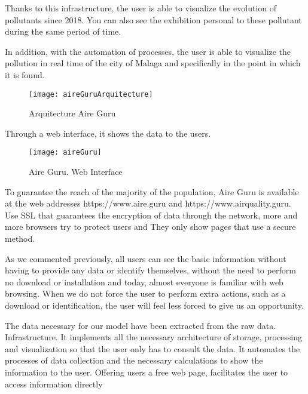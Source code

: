 Thanks to this infrastructure, the user is able to visualize the evolution of pollutants since 2018. You can also see the exhibition
personal to these pollutant during the same period of time.

In addition, with the automation of processes, the user is able to visualize the pollution in real time of the city of Malaga and specifically in the point
in which it is found. \\

\begin{figure}[ht]
    \centering
    \texttt{[image: aireGuruArquitecture]}
    \caption{Arquitecture Aire Guru}
\end{figure}

Through a web interface, it shows the data to the users. \\

\begin{figure}[ht]
    \centering
    \texttt{[image: aireGuru]}
    \caption{Aire Guru. Web Interface}
\end{figure}

To guarantee the reach of the majority of the population, Aire Guru is available at the web addresses https://www.aire.guru and https://www.airquality.guru.
Use SSL that guarantees the encryption of data through the network, more and more browsers try to protect users and
They only show pages that use a secure method.

As we commented previously, all users can see the basic information without having to provide any data or identify themselves, without the need to
perform no download or installation and today, almost everyone is familiar with web browsing.
When we do not force the user to perform extra actions, such as a download or identification, the user will feel less forced to give us an opportunity.


\begin{itemize}
\done The data necessary for our model have been extracted from the raw data.
\done Infrastructure. It implements all the necessary architecture of storage, processing and visualization so that the user only has to consult
the data.
\done It automates the processes of data collection and the necessary calculations to show the information to the user.
\done Offering users a free web page, facilitates the user to access information directly
\end{itemize}

